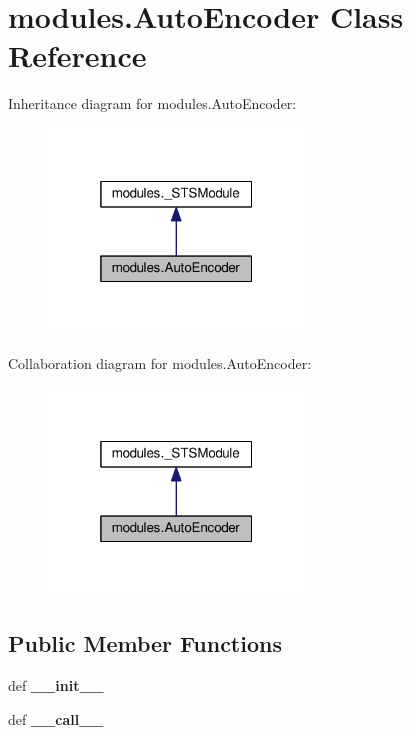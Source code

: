 \hypertarget{classmodules_1_1AutoEncoder}{}\section{modules.\+Auto\+Encoder Class Reference}
\label{classmodules_1_1AutoEncoder}


Inheritance diagram for modules.\+Auto\+Encoder\+:
\nopagebreak
\begin{figure}[H]
\begin{center}
\leavevmode
\includegraphics[width=193pt]{classmodules_1_1AutoEncoder__inherit__graph}
\end{center}
\end{figure}


Collaboration diagram for modules.\+Auto\+Encoder\+:
\nopagebreak
\begin{figure}[H]
\begin{center}
\leavevmode
\includegraphics[width=193pt]{classmodules_1_1AutoEncoder__coll__graph}
\end{center}
\end{figure}
\subsection*{Public Member Functions}
\begin{DoxyCompactItemize}
\item 
def {\bfseries \+\_\+\+\_\+init\+\_\+\+\_\+}\hypertarget{classmodules_1_1AutoEncoder_ab330fa1ddf4e6749656099ed1d5b3881}{}\label{classmodules_1_1AutoEncoder_ab330fa1ddf4e6749656099ed1d5b3881}

\item 
def {\bfseries \+\_\+\+\_\+call\+\_\+\+\_\+}\hypertarget{classmodules_1_1AutoEncoder_a631368683346bf1ce00569e76dfbeeab}{}\label{classmodules_1_1AutoEncoder_a631368683346bf1ce00569e76dfbeeab}

\end{DoxyCompactItemize}


